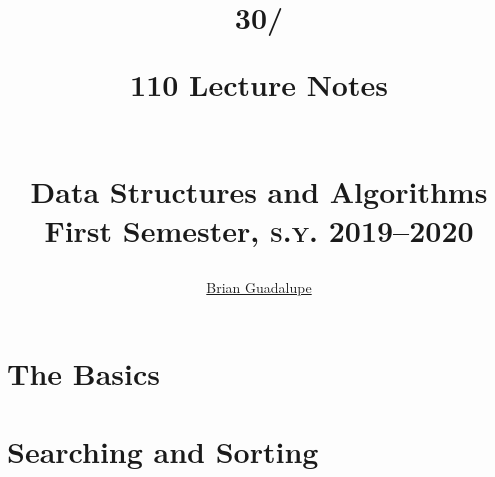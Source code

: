 \documentclass[12pt]{book}
\title{{\whitneylightprop \subject{CSci}{30}/\subject{CS}{110} Lecture Notes}\\%
\large{Data Structures and Algorithms}\\
\large{First Semester, \textsc{s.y.} 2019--2020}}
\author{\href{http://penoy.admu.edu.ph/~guadalupe154884/}{Brian Guadalupe}}
\date{}
\begin{document}
\maketitle
\newpage

\newpage
\setcounter{tocdepth}{1}
\tableofcontents


\part{The Basics}




\part{Searching and Sorting}


% 

% 
% 
% 

% 
% 
% 
% 
% 

% 
% 
% 
% 

% 
% 
% 
% 





\end{document}
